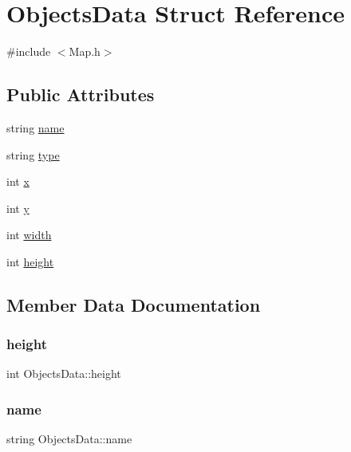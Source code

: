 \hypertarget{struct_objects_data}{}\section{Objects\+Data Struct Reference}
\label{struct_objects_data}


{\ttfamily \#include $<$Map.\+h$>$}

\subsection*{Public Attributes}
\begin{DoxyCompactItemize}
\item 
string \mbox{\hyperlink{struct_objects_data_aad17dcdd7a52cb4de59181b304131c41}{name}}
\item 
string \mbox{\hyperlink{struct_objects_data_ad068c58dced02a94ae114f4724dc64ef}{type}}
\item 
int \mbox{\hyperlink{struct_objects_data_a13664f0c3a97bc492575d4d62d33959a}{x}}
\item 
int \mbox{\hyperlink{struct_objects_data_ad7eab866cc5b483078ad684e9e4c2618}{y}}
\item 
int \mbox{\hyperlink{struct_objects_data_a8502fe4a9822cd85652db1614e8e067f}{width}}
\item 
int \mbox{\hyperlink{struct_objects_data_acec6198c3db2fc3b7b1e2a6dfbf1fe44}{height}}
\end{DoxyCompactItemize}


\subsection{Member Data Documentation}
\mbox{\label{struct_objects_data_acec6198c3db2fc3b7b1e2a6dfbf1fe44}} 
\subsubsection{\texorpdfstring{height}{height}}
{\footnotesize\ttfamily int Objects\+Data\+::height}

\mbox{\label{struct_objects_data_aad17dcdd7a52cb4de59181b304131c41}} 
\subsubsection{\texorpdfstring{name}{name}}
{\footnotesize\ttfamily string Objects\+Data\+::name}


